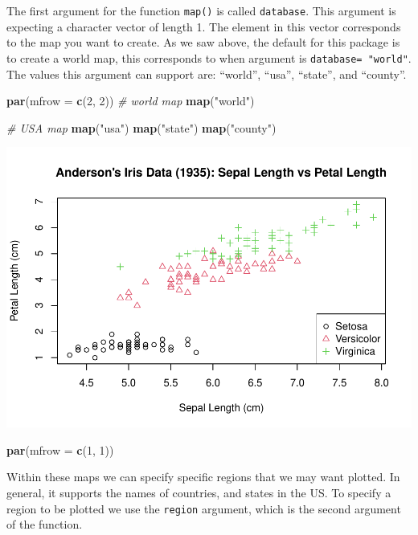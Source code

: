\documentclass[
]{book}
\newenvironment{Shaded}{\begin{snugshade}}{\end{snugshade}}
\newcommand{\CommentTok}[1]{\textcolor[rgb]{0.56,0.35,0.01}{\textit{#1}}}
\newcommand{\DataTypeTok}[1]{\textcolor[rgb]{0.13,0.29,0.53}{#1}}
\newcommand{\DecValTok}[1]{\textcolor[rgb]{0.00,0.00,0.81}{#1}}
\newcommand{\KeywordTok}[1]{\textcolor[rgb]{0.13,0.29,0.53}{\textbf{#1}}}
\newcommand{\NormalTok}[1]{#1}
\newcommand{\StringTok}[1]{\textcolor[rgb]{0.31,0.60,0.02}{#1}}
\begin{document}
The first argument for the function \texttt{map()} is called \texttt{database}. This argument is expecting a character vector of length 1. The element in this vector corresponds to the map you want to create. As we saw above, the default for this package is to create a world map, this corresponds to when argument is \texttt{database=\ "world"}. The values this argument can support are: ``world'', ``usa'', ``state'', and ``county''.

\begin{Shaded}
\begin{Highlighting}[]
\KeywordTok{par}\NormalTok{(}\DataTypeTok{mfrow =} \KeywordTok{c}\NormalTok{(}\DecValTok{2}\NormalTok{, }\DecValTok{2}\NormalTok{))}
\CommentTok{# world map}
\KeywordTok{map}\NormalTok{(}\StringTok{"world"}\NormalTok{)}

\CommentTok{# USA map}
\KeywordTok{map}\NormalTok{(}\StringTok{"usa"}\NormalTok{)}
\KeywordTok{map}\NormalTok{(}\StringTok{"state"}\NormalTok{)}
\KeywordTok{map}\NormalTok{(}\StringTok{"county"}\NormalTok{)}
\end{Highlighting}
\end{Shaded}

\includegraphics{_main_files/figure-latex/unnamed-chunk-193-1.pdf}

\begin{Shaded}
\begin{Highlighting}[]
\KeywordTok{par}\NormalTok{(}\DataTypeTok{mfrow =} \KeywordTok{c}\NormalTok{(}\DecValTok{1}\NormalTok{, }\DecValTok{1}\NormalTok{))}
\end{Highlighting}
\end{Shaded}

Within these maps we can specify specific regions that we may want plotted. In general, it supports the names of countries, and states in the US. To specify a region to be plotted we use the \texttt{region} argument, which is the second argument of the function.
\end{document}
